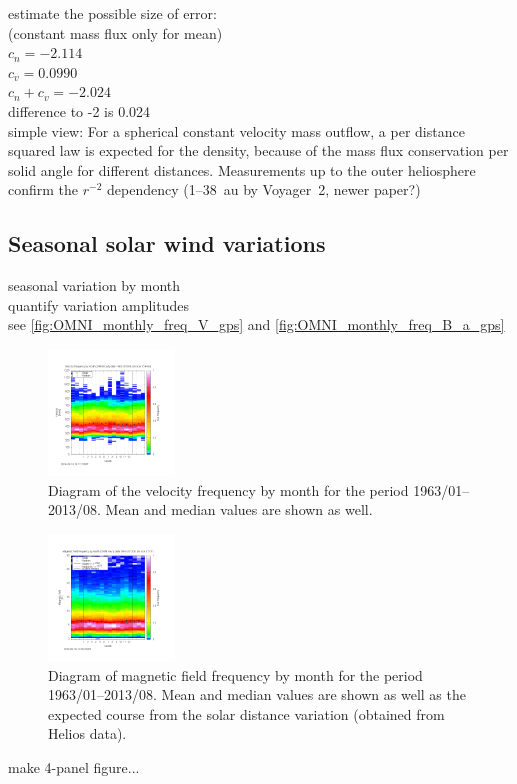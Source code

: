 estimate the possible size of error:\\
(constant mass flux only for mean)\\
$c_n = -2.114$\\
$c_v = 0.0990$\\
$c_n + c_v = -2.024$\\
difference to -2 is 0.024\\

simple view: For a spherical constant velocity mass outflow, a per distance squared law is expected for the density, because of the mass flux conservation per solid angle for different distances. Measurements up to the outer heliosphere confirm the $r^{-2}$ dependency (1--38~au by Voyager~2, \citep{Belcher1993} newer paper?)\\


\subsection{Seasonal solar wind variations}
seasonal variation by month\\
quantify variation amplitudes\\

see \autoref{fig:OMNI_monthly_freq_V_gps} and \autoref{fig:OMNI_monthly_freq_B_a_gps}\\
\begin{figure}[htb]
	\centering
	\includegraphics[width=0.3\textwidth]{figures_of_mine/gnuplots/OMNI_monthly_freq_V_gps.png}
	\caption{Diagram of the velocity frequency by month for the period 1963/01--2013/08. Mean and median values are shown as well.}
	\label{fig:OMNI_monthly_freq_V_gps}
\end{figure}
\begin{figure}[htb]
	\centering
	\includegraphics[width=0.3\textwidth]{figures_of_mine/gnuplots/OMNI_monthly_freq_B_a_gps.png}
	\caption{Diagram of magnetic field frequency by month for the period 1963/01--2013/08. Mean and median values are shown as well as the expected course from the solar distance variation (obtained from Helios data).}
	\label{fig:OMNI_monthly_freq_B_a_gps}
\end{figure}
make 4-panel figure...\\

